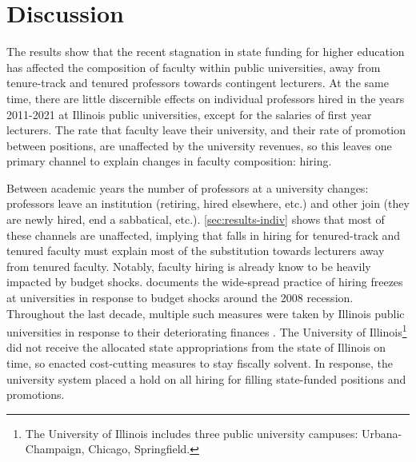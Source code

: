 \section{Discussion}

The results show that the recent stagnation in state funding for higher education has affected the composition of faculty within public universities, away from tenure-track and tenured professors towards contingent lecturers.
At the same time, there are little discernible effects on individual professors hired in the years 2011-2021 at Illinois public universities, except for the salaries of first year lecturers.
The rate that faculty leave their university, and their rate of promotion between positions, are unaffected by the university revenues, so this leaves one primary channel to explain changes in faculty composition: hiring.

Between academic years the number of professors at a university changes: professors leave an institution (retiring, hired elsewhere, etc.) and other join (they are newly hired, end a sabbatical, etc.).
\autoref{sec:results-indiv} shows that most of these channels are unaffected, implying that falls in hiring for tenured-track and tenured faculty must explain most of the substitution towards lecturers away from tenured faculty.
Notably, faculty hiring is already know to be heavily impacted by budget shocks.
\cite{turner2014impact} documents the wide-spread practice of hiring freezes at universities in response to budget shocks around the 2008 recession.
Throughout the last decade, multiple such measures were taken by Illinois public universities in response to their deteriorating finances \citep{furlough2010}.
The University of Illinois\footnote{
    The University of Illinois includes three public university campuses: Urbana-Champaign, Chicago, Springfield.
}
did not receive the allocated state appropriations from the state of Illinois on time, so enacted cost-cutting measures to stay fiscally solvent.
In response, the university system placed a hold on all hiring for filling state-funded positions and promotions.


